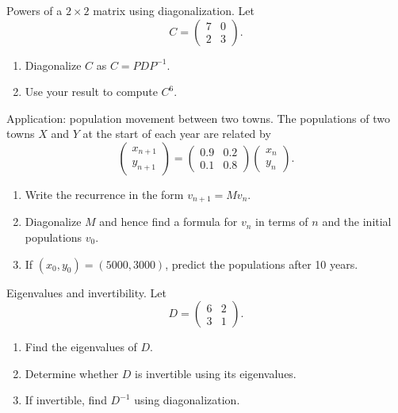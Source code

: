\documentclass[11pt]{article}
\def\textbf#1{#1}%
\def\mathbf#1{#1}%
\newcounter{question}
\begin{document}
\begin{question}
\textbf{Powers of a $2\times 2$ matrix using diagonalization.}
Let 
\[
C = \begin{pmatrix} 7 & 0 \\ 2 & 3 \end{pmatrix}.
\]
\begin{enumerate}
    \item Diagonalize $C$ as $C = PDP^{-1}$.
    \item Use your result to compute $C^{6}$.
\end{enumerate}
\end{question}

\begin{question}
\textbf{Application: population movement between two towns.}
The populations of two towns $X$ and $Y$ at the start of each year are related by
\[
\begin{pmatrix} x_{n+1} \\ y_{n+1} \end{pmatrix} =
\begin{pmatrix} 0.9 & 0.2 \\ 0.1 & 0.8 \end{pmatrix}
\begin{pmatrix} x_n \\ y_n \end{pmatrix}.
\]
\begin{enumerate}
    \item Write the recurrence in the form $\mathbf{v}_{n+1} = M\mathbf{v}_n$.
    \item Diagonalize $M$ and hence find a formula for $\mathbf{v}_n$ in terms of $n$ and the initial populations $\mathbf{v}_0$.
    \item If $(x_0, y_0) = (5000, 3000)$, predict the populations after 10 years.
\end{enumerate}
\end{question}

\begin{question}
\textbf{Eigenvalues and invertibility.}
Let 
\[
D = \begin{pmatrix} 6 & 2 \\ 3 & 1 \end{pmatrix}.
\]
\begin{enumerate}
    \item Find the eigenvalues of $D$.
    \item Determine whether $D$ is invertible using its eigenvalues.
    \item If invertible, find $D^{-1}$ using diagonalization.
\end{enumerate}
\end{question}
\end{document}
